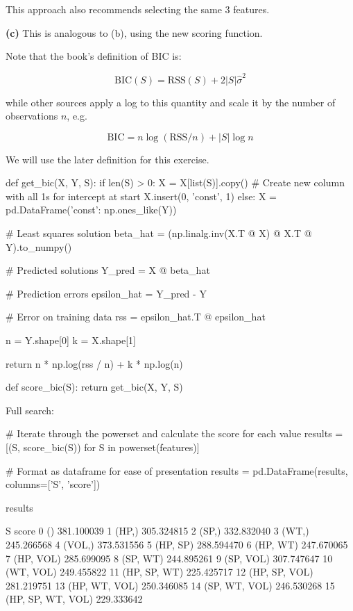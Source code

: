 This approach also recommends selecting the same 3 features.

\textbf{(c)} This is analogous to (b), using the new scoring function.

Note that the book's definition of BIC is:

\[ \text{BIC}(S) = \text{RSS}(S) + 2 |S| \hat{\sigma}^2 \]

while other sources apply a log to this quantity and scale it by the
number of observations \(n\), e.g.

\[ \text{BIC} = n \log \left( \text{RSS} / n \right) + |S| \log n \]

We will use the later definition for this exercise.

\begin{python}
def get_bic(X, Y, S):
    if len(S) > 0:
        X = X[list(S)].copy()
        # Create new column with all 1s for intercept at start
        X.insert(0, 'const', 1)
    else:
        X = pd.DataFrame({'const': np.ones_like(Y)})
    
    # Least squares solution
    beta_hat = (np.linalg.inv(X.T @ X) @ X.T @ Y).to_numpy()

    # Predicted solutions
    Y_pred = X @ beta_hat

    # Prediction errors
    epsilon_hat = Y_pred - Y

    # Error on training data
    rss = epsilon_hat.T @ epsilon_hat
    
    n = Y.shape[0]
    k = X.shape[1]
    
    return n * np.log(rss / n) + k * np.log(n)

def score_bic(S):
    return get_bic(X, Y, S)
\end{python}

Full search:

\begin{python}
# Iterate through the powerset and calculate the score for each value
results = [(S, score_bic(S)) for S in powerset(features)]
    
# Format as dataframe for ease of presentation
results = pd.DataFrame(results, columns=['S', 'score'])
\end{python}

\begin{python}
results
\end{python}

\begin{console}
                    S       score
0                  ()  381.100039
1               (HP,)  305.324815
2               (SP,)  332.832040
3               (WT,)  245.266568
4              (VOL,)  373.531556
5            (HP, SP)  288.594470
6            (HP, WT)  247.670065
7           (HP, VOL)  285.699095
8            (SP, WT)  244.895261
9           (SP, VOL)  307.747647
10          (WT, VOL)  249.455822
11       (HP, SP, WT)  225.425717
12      (HP, SP, VOL)  281.219751
13      (HP, WT, VOL)  250.346085
14      (SP, WT, VOL)  246.530268
15  (HP, SP, WT, VOL)  229.333642
\end{console}

